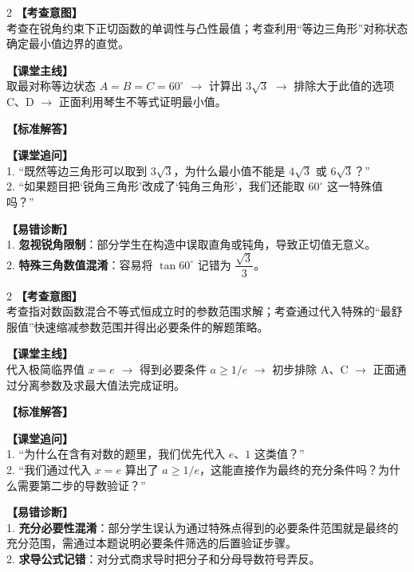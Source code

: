 \documentclass[12pt,a4paper]{ctexart}
\begin{document}
\begin{paracol}{2}
  \textbf{【考查意图】}\\
  考查在锐角约束下正切函数的单调性与凸性最值；考查利用“等边三角形”对称状态确定最小值边界的直觉。
  
  \textbf{【课堂主线】}\\
  取最对称等边状态 \(A=B=C=60^\circ\) \(\to\) 计算出 \(3\sqrt{3}\) \(\to\) 排除大于此值的选项 C、D \(\to\) 正面利用琴生不等式证明最小值。
  
  \textbf{【标准解答】}\\
  \qTwoSolution
  
  \textbf{【课堂追问】}\\
  1. “既然等边三角形可以取到 \(3\sqrt{3}\)，为什么最小值不能是 \(4\sqrt{3}\) 或 \(6\sqrt{3}\)？”\\
  2. “如果题目把‘锐角三角形’改成了‘钝角三角形’，我们还能取 \(60^\circ\) 这一特殊值吗？”
  
  \switchcolumn
  \textbf{【易错诊断】}\\
  1. \textbf{忽视锐角限制}：部分学生在构造中误取直角或钝角，导致正切值无意义。\\
  2. \textbf{特殊三角数值混淆}：容易将 \(\tan 60^\circ\) 记错为 \(\dfrac{\sqrt{3}}{3}\)。
\end{paracol}

\vspace{0.8em}
\par{}
\vspace{0.8em}

\newpage

\qThreeStem
\qThreeOptions

\begin{paracol}{2}
  \textbf{【考查意图】}\\
  考查指对数函数混合不等式恒成立时的参数范围求解；考查通过代入特殊的“最舒服值”快速缩减参数范围并得出必要条件的解题策略。
  
  \textbf{【课堂主线】}\\
  代入极简临界值 \(x=e\) \(\to\) 得到必要条件 \(a \geqslant 1/e\) \(\to\) 初步排除 A、C \(\to\) 正面通过分离参数及求最大值法完成证明。
  
  \textbf{【标准解答】}\\
  \qThreeSolution
  
  \textbf{【课堂追问】}\\
  1. “为什么在含有对数的题里，我们优先代入 \(e\)、\(1\) 这类值？”\\
  2. “我们通过代入 \(x=e\) 算出了 \(a \geqslant 1/e\)，这能直接作为最终的充分条件吗？为什么需要第二步的导数验证？”
  
  \switchcolumn
  \textbf{【易错诊断】}\\
  1. \textbf{充分必要性混淆}：部分学生误认为通过特殊点得到的必要条件范围就是最终的充分范围，需通过本题说明必要条件筛选的后置验证步骤。\\
  2. \textbf{求导公式记错}：对分式商求导时把分子和分母导数符号弄反。
\end{paracol}
\end{document}
